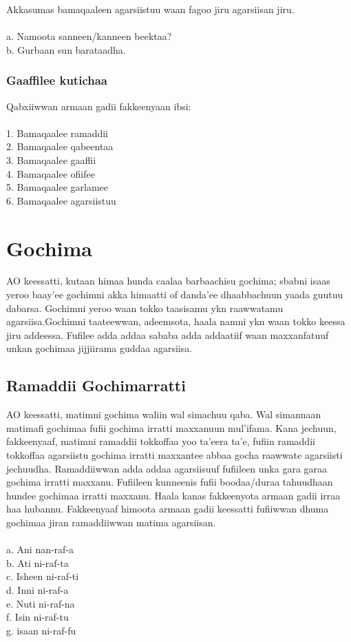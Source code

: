 \documentclass[11pt,b5paper]{book}
\begin{document}
Akkasumas bamaqaaleen agarsiistuu waan fagoo jiru agarsiisan
jiru. \\
\\
a. Namoota sanneen/kanneen beektaa?\\
b. Gurbaan sun barataadha.

\subsubsection{Gaaffilee kutichaa}
Qabxiiwwan armaan gadii fakkeenyaan ibsi:\\
\\
1. Bamaqaalee ramaddii\\
2. Bamaqaalee qabeentaa\\
3. Bamaqaalee gaaffii\\
4. Bamaqaalee ofiifee\\
5. Bamaqaalee garlamee\\
6. Bamaqaalee agarsiistuu

\newpage
\section{Gochima}
AO keessatti, kutaan himaa hunda caalaa barbaachisu gochima; sbabni isaas yeroo baay'ee gochimni akka himaatti of danda’ee dhaabbachuun yaada guutuu dabarsa. Gochimni
yeroo waan tokko taasisamu ykn raawwatamu agarsiisa.Gochimni taateewwan, adeemsota, haala namni ykn waan tokko keessa jiru addeessa. Fufilee adda addaa sababa adda addaatiif waan maxxanfatuuf unkan gochimaa jijjiirama guddaa
agarsiisa.

\subsection{Ramaddii Gochimarratti}
AO keessatti, matimni gochima waliin wal simachuu qaba. Wal simannaan matimafi gochimaa fufii gochima irratti maxxanuun mul'ifama. Kana jechuun, fakkeenyaaf, matimni ramaddii tokkoffaa yoo ta'eera ta'e, fufiin ramaddii tokkoffaa agarsiistu gochima irratti maxxantee abbaa gocha raawwate agarsiisti jechuudha. Ramaddiiwwan adda addaa agarsiisuuf fufiileen unka gara garaa gochima irratti maxxanu. Fufiileen kunneenis fufii boodaa/duraa tahuudhaan hundee gochimaa irratti maxxanu. Haala kanas fakkeenyota armaan gadii irraa haa hubannu. Fakkeenyaaf himoota armaan gadii keessatti fufiiwwan dhuma gochimaa jiran ramaddiiwwan matima agarsiisan. \\
\\
a. Ani nan-raf-a\\
b. Ati ni-raf-ta\\
c. Isheen ni-raf-ti\\
d. Inni ni-raf-a\\
e. Nuti ni-raf-na\\
f. Isin ni-raf-tu\\
g. isaan ni-raf-fu
\end{document}
